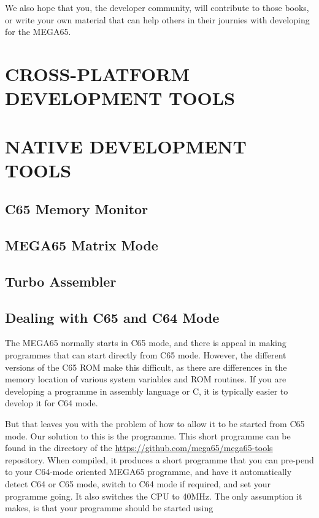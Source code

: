 We also hope that you, the developer community, will contribute to
those books, or write your own material that can help others in their
journies with developing for the MEGA65.

\part{CROSS-PLATFORM DEVELOPMENT TOOLS}








\part{NATIVE DEVELOPMENT TOOLS}

\chapter{C65 Memory Monitor}

\chapter{MEGA65 Matrix Mode}

\chapter{Turbo Assembler}

\chapter{Dealing with C65 and C64 Mode}

The MEGA65 normally starts in C65 mode, and there is appeal in making
programmes that can start directly from C65 mode.  However, the
different versions of the C65 ROM make this difficult, as there are
differences in the memory location of various system variables and ROM
routines.  If you are developing a programme in assembly language or
C, it is typically easier to develop it for C64 mode.

But that leaves
you with the problem of how to allow it to be started from C65 mode.
Our solution to this is the  programme.  This
short programme can be found in the  directory of
the \url{https://github.com/mega65/mega65-tools} repository.  When
compiled, it produces a short programme that you can pre-pend to your
C64-mode oriented MEGA65 programme, and have it automatically detect
C64 or C65 mode, switch to C64 mode if required, and set your
programme going. It also switches the CPU to 40MHz.  The only
assumption it makes, is that your programme should be started using

